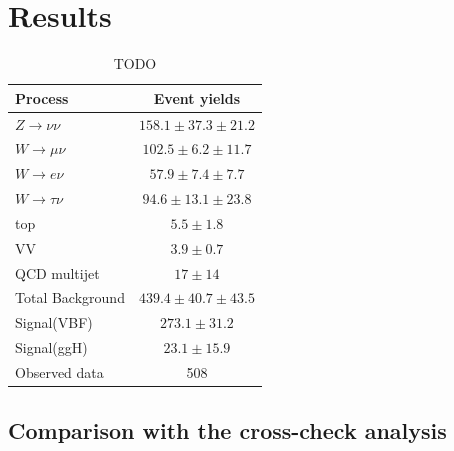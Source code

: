 \section{Results}


\begin{table}[!htb]
\centering
\begin{tabular}{|l|c|}
\hline 
Process & Event yields \\
\hline\hline
$Z\rightarrow\nu\nu$  & $158.1 \pm 37.3 \pm 21.2$ \\
$W\rightarrow\mu\nu$  & $102.5 \pm 6.2  \pm 11.7$ \\
$W\rightarrow e\nu$   & $ 57.9 \pm 7.4  \pm  7.7$ \\
$W\rightarrow\tau\nu$ & $ 94.6 \pm 13.1 \pm 23.8$ \\
top                   & $  5.5 \pm 1.8$           \\
VV                    & $  3.9 \pm 0.7$           \\
QCD multijet          & $ 17   \pm 14$            \\
\hline\hline
Total Background      & $439.4 \pm 40.7 \pm 43.5$ \\
\hline\hline
Signal(VBF)           & $273.1 \pm 31.2 $         \\
Signal(ggH)           & $ 23.1 \pm 15.9 $         \\
\hline\hline
Observed data         & 508                       \\
\hline
\end{tabular}
\caption{TODO \cite{ARTICLE:CMSVBFHiggsInvisibleParkedAnalysisPAS}}
\label{TABLE:ParkedDataAnalysis_Results_Summary}
\end{table}

\subsection{Comparison with the cross-check analysis}


